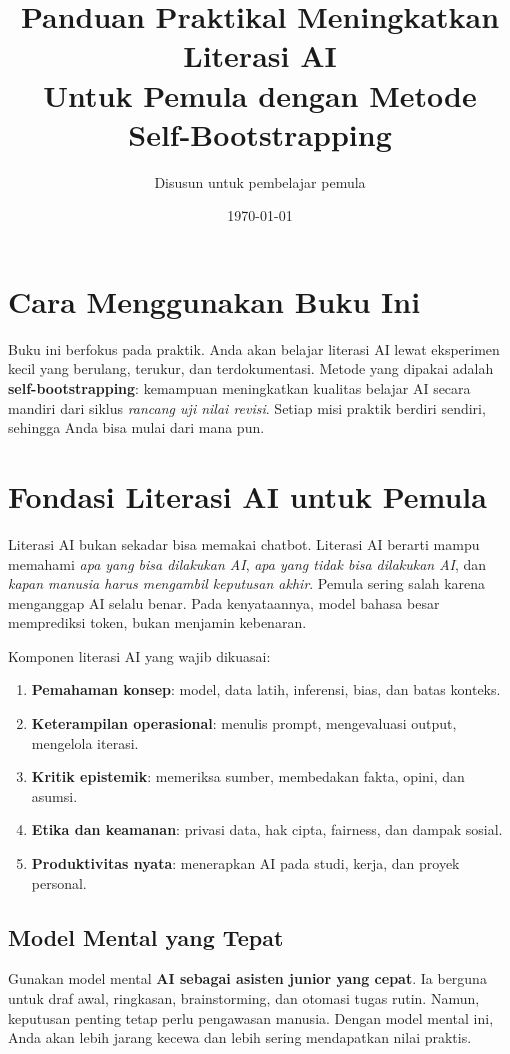 \documentclass[12pt,oneside]{book}
\title{Panduan Praktikal Meningkatkan Literasi AI\\ \large Untuk Pemula dengan Metode Self-Bootstrapping}
\author{Disusun untuk pembelajar pemula}
\date{\today}
\begin{document}
\frontmatter
\maketitle
\tableofcontents
\chapter*{Cara Menggunakan Buku Ini}
Buku ini berfokus pada praktik. Anda akan belajar literasi AI lewat eksperimen kecil yang berulang, terukur, dan terdokumentasi. Metode yang dipakai adalah \textbf{self-bootstrapping}: kemampuan meningkatkan kualitas belajar AI secara mandiri dari siklus \textit{rancang \textrightarrow{} uji \textrightarrow{} nilai \textrightarrow{} revisi}. Setiap misi praktik berdiri sendiri, sehingga Anda bisa mulai dari mana pun.

\mainmatter
\chapter{Fondasi Literasi AI untuk Pemula}
Literasi AI bukan sekadar bisa memakai chatbot. Literasi AI berarti mampu memahami \textit{apa yang bisa dilakukan AI}, \textit{apa yang tidak bisa dilakukan AI}, dan \textit{kapan manusia harus mengambil keputusan akhir}. Pemula sering salah karena menganggap AI selalu benar. Pada kenyataannya, model bahasa besar memprediksi token, bukan menjamin kebenaran.

Komponen literasi AI yang wajib dikuasai:
\begin{enumerate}[leftmargin=*]
\item \textbf{Pemahaman konsep}: model, data latih, inferensi, bias, dan batas konteks.
\item \textbf{Keterampilan operasional}: menulis prompt, mengevaluasi output, mengelola iterasi.
\item \textbf{Kritik epistemik}: memeriksa sumber, membedakan fakta, opini, dan asumsi.
\item \textbf{Etika dan keamanan}: privasi data, hak cipta, fairness, dan dampak sosial.
\item \textbf{Produktivitas nyata}: menerapkan AI pada studi, kerja, dan proyek personal.
\end{enumerate}

\section*{Model Mental yang Tepat}
Gunakan model mental \textbf{AI sebagai asisten junior yang cepat}. Ia berguna untuk draf awal, ringkasan, brainstorming, dan otomasi tugas rutin. Namun, keputusan penting tetap perlu pengawasan manusia. Dengan model mental ini, Anda akan lebih jarang kecewa dan lebih sering mendapatkan nilai praktis.
\end{document}
